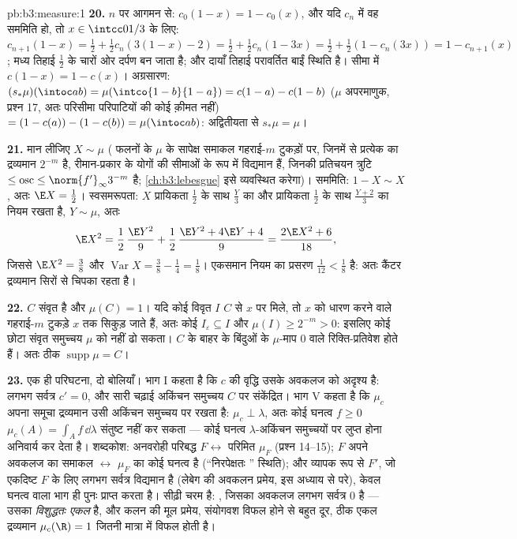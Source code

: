 \begin{solution}{pb:b3:measure:1}
\textbf{20.} $n$ पर आगमन से: $c_0(1-x) = 1 - c_0(x)$, और यदि $c_n$ में वह सममिति हो,
तो $x \in
\intcc0{1/3}$ के लिए: $c_{n+1}(1 - x) = \frac12 + \frac12c_n(3(1-x)
- 2) = \frac12 + \frac12c_n(1 - 3x) = \frac12 + \frac12(1 -
c_n(3x)) = 1 - c_{n+1}(x)$; मध्य तिहाई $\frac12$ के चारों ओर दर्पण बन जाता
है; और दायाँ तिहाई परावर्तित बाईं स्थिति है। सीमा में $c(1-x) = 1 - c(x)$।
अग्रसारण: $(s_*\mu)(\intoc ab)
= \mu(\intco{1-b}{1-a}) = c(1-a) - c(1-b)$ ($\mu$ अपरमाणुक, प्रश्न 17, अतः परिसीमा परिपाटियों
की कोई क़ीमत नहीं) $= (1 -
c(a)) - (1 - c(b)) = \mu(\intoc ab)$: अद्वितीयता से $s_*\mu = \mu$।

\textbf{21.} मान लीजिए $X \sim \mu$ ( फलनों के $\mu$ के सापेक्ष समाकल
गहराई-$m$ टुकड़ों पर, जिनमें से प्रत्येक का द्रव्यमान $2^{-m}$ है,
रीमान-प्रकार के योगों की सीमाओं के रूप में विद्यमान हैं, जिनकी
प्रतिचयन त्रुटि $\leq \operatorname{osc} \leq
\norm{f'}_\infty3^{-m}$ है; \cref{ch:b3:lebesgue} इसे व्यवस्थित करेगा)। सममिति: $1 - X \sim X$,
अतः $\E X =
\frac12$। स्वसमरूपता: $X$ प्रायिकता $\frac12$ के साथ $\frac Y3$ का और
प्रायिकता $\frac12$ के साथ $\frac{Y+2}3$ का नियम रखता है, $Y \sim \mu$, अतः
\[
\E X^2 = \frac12\,\frac{\E Y^2}9 + \frac12\,
\frac{\E Y^2 + 4\E Y + 4}{9} = \frac{2\E X^2 + 6}{18},
\]
जिससे $\E X^2 = \frac38$ और $\operatorname{Var}X = \frac38
- \frac14 = \frac18$। एकसमान नियम का प्रसरण $\frac1{12} < \frac18$ है: अतः कैंटर
द्रव्यमान सिरों से चिपका रहता है।

\textbf{22.} $C$ संवृत है और $\mu(C) = 1$। यदि कोई विवृत $I$ $C$ से
$x$ पर मिले, तो $x$ को धारण करने वाले गहराई-$m$ टुकड़े $x$
तक सिकुड़ जाते हैं, अतः कोई $I_\varepsilon \subseteq I$ और $\mu(I) \geq
2^{-m} > 0$: इसलिए कोई छोटा संवृत
समुच्चय $\mu$ को नहीं ढो सकता। $C$ के बाहर के बिंदुओं के $\mu$-माप
$0$ वाले रिक्ति-प्रतिवेश होते हैं। अतः ठीक $\operatorname{supp}\mu = C$।

\textbf{23.} एक ही परिघटना, दो बोलियाँ। भाग I कहता है कि $c$ की
वृद्धि उसके अवकलज को अदृश्य है: लगभग सर्वत्र $c' = 0$, और सारी चढ़ाई
अकिंचन समुच्चय $C$ पर संकेंद्रित। भाग V कहता है कि  
$\mu_c$ अपना समूचा द्रव्यमान उसी अकिंचन समुच्चय पर रखता है: $\mu_c \perp \lambda$,
अतः कोई घनत्व $f \geq
0$ $\mu_c(A) = \int_Af\,\dd\lambda$ संतुष्ट नहीं कर सकता --- कोई घनत्व
$\lambda$-अकिंचन समुच्चयों पर लुप्त होना अनिवार्य कर देता है। शब्दकोश:
अनवरोही परिबद्ध $F \leftrightarrow$ परिमित  $\mu_F$ (प्रश्न 14--15); $F$ अपने
अवकलज का समाकल $\leftrightarrow$ $\mu_F$ का कोई घनत्व है (``निरपेक्षतः ''
स्थिति); और व्यापक रूप से $F'$, जो एकदिष्ट $F$ के लिए लगभग सर्वत्र
विद्यमान है (लेबेग की अवकलन प्रमेय, इस अध्याय से परे), केवल घनत्व
वाला भाग ही पुनः प्राप्त करता है। सीढ़ी चरम है: , जिसका अवकलज
लगभग सर्वत्र $0$ है --- उसका  \emph{विशुद्धतः एकल} है, और कलन
की मूल प्रमेय, संयोगवश विफल होने से बहुत दूर, ठीक एकल द्रव्यमान
$\mu_c(\R) = 1$ जितनी मात्रा में विफल होती है।


\end{solution}

